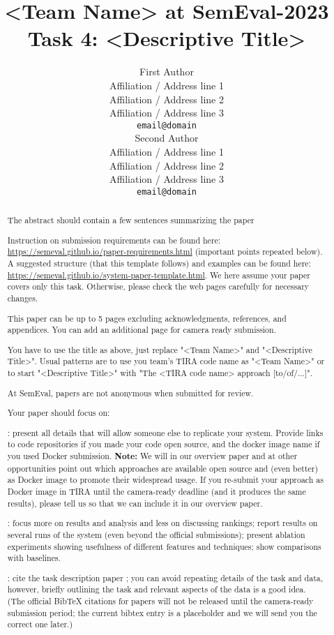 \documentclass[11pt]{article}
\title{<Team Name> at SemEval-2023 Task 4: <Descriptive Title>}
\author{First Author \\
  Affiliation / Address line 1 \\
  Affiliation / Address line 2 \\
  Affiliation / Address line 3 \\
  \texttt{email@domain} \\\And
  Second Author \\
  Affiliation / Address line 1 \\
  Affiliation / Address line 2 \\
  Affiliation / Address line 3 \\
  \texttt{email@domain} \\}
\begin{document}
\maketitle
\begin{abstract}
The abstract should contain a few sentences summarizing the paper

Instruction on submission requirements can be found here: \url{https://semeval.github.io/paper-requirements.html} (important points repeated below). A suggested structure (that this template follows) and examples can be found here: \url{https://semeval.github.io/system-paper-template.html}. We here assume your paper covers only this task. Otherwise, please check the web pages carefully for necessary changes.

This paper can be up to 5 pages excluding acknowledgments, references, and appendices. You can add an additional page for camera ready submission.

You have to use the title as above, just replace "<Team Name>" and "<Descriptive Title>". Usual patterns are to use you team's TIRA code name as "<Team Name>" or to start "<Descriptive Title>" with "The <TIRA code name> approach [to/of/...]".

At SemEval, papers are not anonymous when submitted for review.

Your paper should focus on:
\par{}: present all details that will allow someone else to replicate your system. Provide links to code repositories if you made your code open source, and the docker image name if you used Docker submission. {\bf Note:} We will in our overview paper and at other opportunities point out which approaches are available open source and (even better) as Docker image to promote their widespread usage. If you re-submit your approach as Docker image in TIRA until the camera-ready deadline (and it produces the same results), please tell us so that we can include it in our overview paper.
\par{}: focus more on results and analysis and less on discussing rankings; report results on several runs of the system (even beyond the official submissions); present ablation experiments showing usefulness of different features and techniques; show comparisons with baselines.
\par{}: cite the task description paper \cite{kiesel:2023}; you can avoid repeating details of the task and data, however, briefly outlining the task and relevant aspects of the data is a good idea. (The official BibTeX citations for papers will not be released until the camera-ready submission period; the current bibtex entry is a placeholder and we will send you the correct one later.)

\end{abstract}
\end{document}
